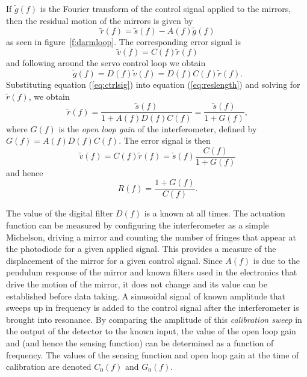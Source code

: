 If $\tilde{g}(f)$ is the Fourier transform of the control signal applied to
the mirrors, then the residual motion of the mirrors is given by 
\begin{equation}
\tilde{r}(f) = \tilde{s}(f) - A(f)\tilde{g}(f)
\label{eq:reslength}
\end{equation}
as seen in figure~\ref{f:darmloop}. The corresponding error signal is
\begin{equation}
\tilde{v}(f) = C(f) \tilde{r}(f)
\end{equation}
and following around the servo control loop we obtain
\begin{equation}
\tilde{g}(f) = D(f) \tilde{v}(f) = D(f) C(f) \tilde{r}(f).
\label{eq:ctrlsig}
\end{equation}
Substituting equation (\ref{eq:ctrlsig}) into equation (\ref{eq:reslength})
and solving for $\tilde{r}(f)$, we obtain
\begin{equation}
\tilde{r}(f) = \frac{\tilde{s}(f)}{1 + A(f)D(f)C(f)} = \frac{\tilde{s}(f)}{1 + G(f)},
\end{equation}
where $G(f)$ is the \emph{open loop gain} of the interferometer, defined by
$G(f) = A(f)D(f)C(f)$. The error signal is then
\begin{equation}
\tilde{v}(f) = C(f) \tilde{r}(f) = \tilde{s}(f) \frac{C(f)}{1 + G(f)}
\end{equation}
and hence
\begin{equation}
R(f) = \frac{1 + G(f)}{C(f)}.
\end{equation}

The value of the digital filter $D(f)$ is a known at all times.  The
actuation function can be measured by configuring the interferometer as a
simple Michelson, driving a mirror and counting the number of fringes that
appear at the photodiode for a given applied signal. This provides a measure
of the displacement of the mirror for a given control signal.  Since $A(f)$ is
due to the pendulum response of the mirror and known filters used in the
electronics that drive the motion of the mirror, it does not change and its
value can be established before data taking. A sinusoidal
signal of known amplitude that sweeps up in frequency is added to the control
signal after the interferometer is brought into resonance. By comparing the
amplitude of this \emph{calibration sweep} in the output of the detector to
the known input, the value of the open loop
gain and (and hence the sensing function) can be determined as a function of
frequency. The values of the
sensing function and open loop gain at the time of calibration are denoted
$C_0(f)$ and $G_0(f)$.

